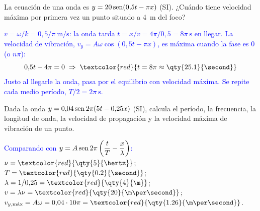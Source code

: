 \begin{exercise}
    La ecuación de una onda es \(y = 20\operatorname{sen}(0{,}5t - \pi x)\) (SI). ¿Cuándo tiene velocidad máxima por primera vez un punto
    situado a \qty{4}{\m} del foco?
    \begin{solu}
        \textcolor{blue}{\(v = \omega/k = 0{,}5/\pi\ \unit{\m\per\second}\): la onda tarda \(t = x/v = 4\pi/0{,}5 = 8\pi\ \unit{\second}\) en llegar.
        La velocidad de vibración, \(v_y = A\omega\cos(0{,}5t - \pi x)\), es máxima cuando la fase es \(0\) (o \(n\pi\)):}
        \[ 0{,}5t - 4\pi = 0 \;\Rightarrow\; \textcolor{red}{t = 8\pi \approx \qty{25.1}{\second}} \]
        \textcolor{blue}{Justo al llegarle la onda, pasa por el equilibrio con velocidad máxima. Se repite cada medio período, \(T/2 = 2\pi\ \unit{\second}\).}
    \end{solu}
\end{exercise}

\begin{exercise}
    Dada la onda \(y = 0{,}04\operatorname{sen} 2\pi(5t - 0{,}25x)\) (SI), calcula el período, la frecuencia, la longitud de onda, la
    velocidad de propagación y la velocidad máxima de vibración de un punto.
    \begin{solu}
        \textcolor{blue}{Comparando con \(y = A\operatorname{sen} 2\pi\left(\dfrac{t}{T} - \dfrac{x}{\lambda}\right)\):}
        \(\nu = \textcolor{red}{\qty{5}{\hertz}}\); \(T = \textcolor{red}{\qty{0.2}{\second}}\); \(\lambda = 1/0{,}25 = \textcolor{red}{\qty{4}{\m}}\);
        \(v = \lambda\nu = \textcolor{red}{\qty{20}{\m\per\second}}\); \(v_{y,\text{máx}} = A\omega = 0{,}04\cdot 10\pi = \textcolor{red}{\qty{1.26}{\m\per\second}}\).
    \end{solu}
\end{exercise}

